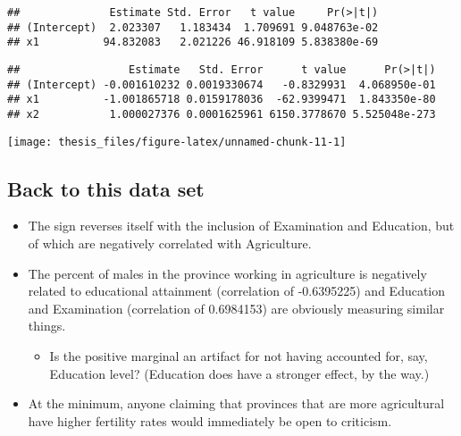 \documentclass[12pt,openright,oneside,a4paper,chapter=TITLE,section=TITLE,subsection=Title,english,french,spanish,portugues,sumario=tradicional]{04-class-files/abntex2}
\newenvironment{Shaded}{\begin{snugshade}}{\end{snugshade}}
\newcommand{\KeywordTok}[1]{\textcolor[rgb]{0.13,0.29,0.53}{\textbf{#1}}}
\newcommand{\NormalTok}[1]{#1}
\newcommand{\OperatorTok}[1]{\textcolor[rgb]{0.81,0.36,0.00}{\textbf{#1}}}
\newcommand{\StringTok}[1]{\textcolor[rgb]{0.31,0.60,0.02}{#1}}
\providecommand{\tightlist}{%
  \setlength{\itemsep}{0pt}\setlength{\parskip}{0pt}}
\begin{document}
\begin{verbatim}
##              Estimate Std. Error   t value     Pr(>|t|)
## (Intercept)  2.023307   1.183434  1.709691 9.048763e-02
## x1          94.832083   2.021226 46.918109 5.838380e-69
\end{verbatim}

\begin{Shaded}
\end{Shaded}

\begin{verbatim}
##                 Estimate   Std. Error      t value      Pr(>|t|)
## (Intercept) -0.001610232 0.0019330674   -0.8329931  4.068950e-01
## x1          -1.001865718 0.0159178036  -62.9399471  1.843350e-80
## x2           1.000027376 0.0001625961 6150.3778670 5.525048e-273
\end{verbatim}

\begin{center}\texttt{[image: thesis\_files/figure-latex/unnamed-chunk-11-1]} \end{center}

\hypertarget{back-to-this-data-set}{%
\subsection{Back to this data set}\label{back-to-this-data-set}}

\begin{itemize}
\tightlist
\item
  The sign reverses itself with the inclusion of Examination and Education, but of which are negatively correlated with Agriculture.
\item
  The percent of males in the province working in agriculture is negatively related to educational attainment (correlation of -0.6395225) and Education and Examination (correlation of 0.6984153) are obviously measuring similar things.

  \begin{itemize}
  \tightlist
  \item
    Is the positive marginal an artifact for not having accounted for, say, Education level? (Education does have a stronger effect, by the way.)
  \end{itemize}
\item
  At the minimum, anyone claiming that provinces that are more agricultural have higher fertility rates would immediately be open to criticism.
\end{itemize}
\end{document}
